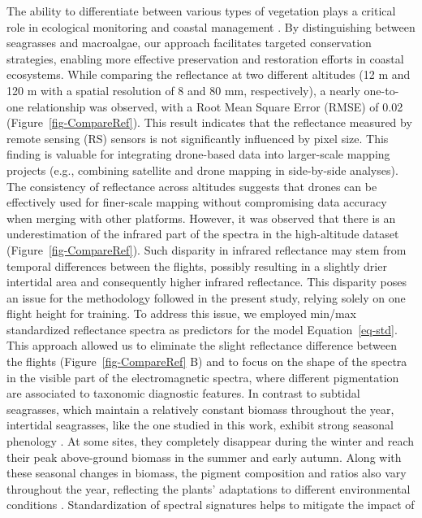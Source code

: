 \documentclass[
  number]{elsarticle}
\begin{document}
The ability to differentiate between various types of vegetation plays a
critical role in ecological monitoring and coastal management
\citep{WFD2000}. By distinguishing between seagrasses and macroalgae,
our approach facilitates targeted conservation strategies, enabling more
effective preservation and restoration efforts in coastal ecosystems.
While comparing the reflectance at two different altitudes (12 m and 120
m with a spatial resolution of 8 and 80 mm, respectively), a nearly
one-to-one relationship was observed, with a Root Mean Square Error
(RMSE) of 0.02 (Figure~\ref{fig-CompareRef}). This result indicates that
the reflectance measured by remote sensing (RS) sensors is not
significantly influenced by pixel size. This finding is valuable for
integrating drone-based data into larger-scale mapping projects (e.g.,
combining satellite and drone mapping in side-by-side analyses). The
consistency of reflectance across altitudes suggests that drones can be
effectively used for finer-scale mapping without compromising data
accuracy when merging with other platforms. However, it was observed
that there is an underestimation of the infrared part of the spectra in
the high-altitude dataset (Figure~\ref{fig-CompareRef}). Such disparity
in infrared reflectance may stem from temporal differences between the
flights, possibly resulting in a slightly drier intertidal area and
consequently higher infrared reflectance. This disparity poses an issue
for the methodology followed in the present study, relying solely on one
flight height for training. To address this issue, we employed min/max
standardized reflectance spectra as predictors for the model
Equation~\ref{eq-std}. This approach allowed us to eliminate the slight
reflectance difference between the flights (Figure~\ref{fig-CompareRef}
B) and to focus on the shape of the spectra in the visible part of the
electromagnetic spectra, where different pigmentation are associated to
taxonomic diagnostic features. In contrast to subtidal seagrasses, which
maintain a relatively constant biomass throughout the year, intertidal
seagrasses, like the one studied in this work, exhibit strong seasonal
phenology \citep{davies2024sentinel}. At some sites, they completely
disappear during the winter and reach their peak above-ground biomass in
the summer and early autumn. Along with these seasonal changes in
biomass, the pigment composition and ratios also vary throughout the
year, reflecting the plants' adaptations to different environmental
conditions \citep{bargain2013seasonal, legare2022remote}.
Standardization of spectral signatures helps to mitigate the impact of
\end{document}
